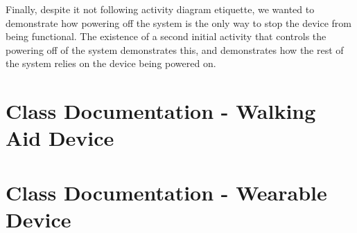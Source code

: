                 Finally, despite it not following activity diagram etiquette, we wanted to demonstrate how powering off the system is the only way to stop the device from being functional. The existence of a second initial activity that controls the powering off of the system demonstrates this, and demonstrates how the rest of the system relies on the device being powered on.

                \newpage

    \section{Class Documentation - Walking Aid Device}
    \label{sec:class_documentation_walk_aid}\mbox{}

        
        \newpage
        
        \newpage
        
        \newpage
        
        \newpage
        
        \newpage
        
        \newpage

    \section{Class Documentation - Wearable Device}
    \label{sec:class_documentation_wearable}\mbox{}

        
        \newpage
        
        \newpage
        
        \newpage
        
        \newpage
